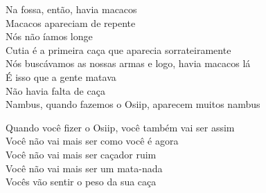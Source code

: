 \bigskip

\begin{linenumbers}\begingroup\raggedright
 
\noindent  Na fossa, então, havia macacos\\
 Macacos apareciam de repente\\
 Nós não íamos longe\\
 Cutia é a primeira caça que aparecia sorrateiramente\\
 Nós buscávamos as nossas armas e logo, havia macacos lá\\
 É isso que a gente matava\\
 Não havia falta de caça\\
 Nambus, quando fazemos o Osiip, aparecem muitos nambus
 
\end{linenumbers}\endgroup

\bigskip

\begin{linenumbers}\begingroup\raggedright
 
\noindent  Quando você fizer o Osiip, você também vai ser assim\\
 Você não vai mais ser como você é agora\\
 Você não vai mais ser caçador ruim\\
 Você não vai mais ser um mata-nada\\
 Vocês vão sentir o peso da sua caça
 
\end{linenumbers}\endgroup

